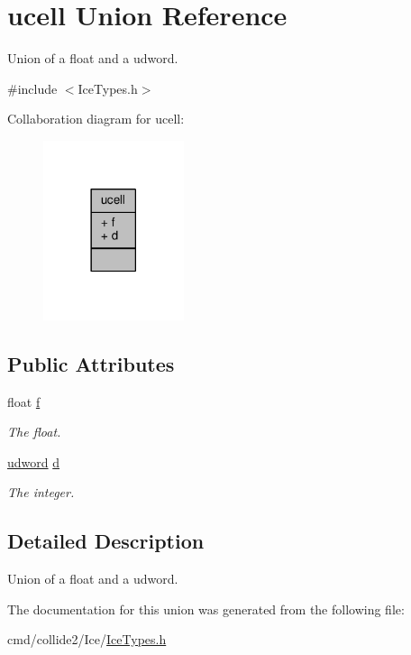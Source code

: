 \hypertarget{unionucell}{}\section{ucell Union Reference}
\label{unionucell}


Union of a float and a udword.  




{\ttfamily \#include $<$Ice\+Types.\+h$>$}



Collaboration diagram for ucell\+:
\nopagebreak
\begin{figure}[H]
\begin{center}
\leavevmode
\includegraphics[width=117pt]{d8/d29/unionucell__coll__graph}
\end{center}
\end{figure}
\subsection*{Public Attributes}
\begin{DoxyCompactItemize}
\item 
float \hyperlink{unionucell_a15c1e89749e0c8c8d1a1318e04b64e86}{f}\hypertarget{unionucell_a15c1e89749e0c8c8d1a1318e04b64e86}{}\label{unionucell_a15c1e89749e0c8c8d1a1318e04b64e86}

\begin{DoxyCompactList}\small\item\em The float. \end{DoxyCompactList}\item 
\hyperlink{IceTypes_8h_a44c6f1920ba5551225fb534f9d1a1733}{udword} \hyperlink{unionucell_a054210bf23564d385aef75d5450d83cc}{d}\hypertarget{unionucell_a054210bf23564d385aef75d5450d83cc}{}\label{unionucell_a054210bf23564d385aef75d5450d83cc}

\begin{DoxyCompactList}\small\item\em The integer. \end{DoxyCompactList}\end{DoxyCompactItemize}


\subsection{Detailed Description}
Union of a float and a udword. 

The documentation for this union was generated from the following file\+:\begin{DoxyCompactItemize}
\item 
cmd/collide2/\+Ice/\hyperlink{IceTypes_8h}{Ice\+Types.\+h}\end{DoxyCompactItemize}
